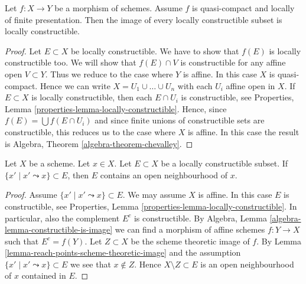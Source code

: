 \begin{theorem}
\label{theorem-chevalley}
\begin{reference}
\cite[IV, Theorem 1.8.4]{EGA}
\end{reference}
Let $f : X \to Y$ be a morphism of schemes.
Assume $f$ is quasi-compact and locally of finite presentation.
Then the image of every locally constructible subset is locally constructible.
\end{theorem}

\begin{proof}
Let $E \subset X$ be locally constructible.
We have to show that $f(E)$ is locally constructible too.
We will show that $f(E) \cap V$ is constructible for any affine
open $V \subset Y$. Thus we reduce to the case where $Y$ is affine.
In this case $X$ is quasi-compact. Hence we can write
$X = U_1 \cup \ldots \cup U_n$ with each $U_i$ affine open in $X$.
If $E \subset X$ is locally constructible, then each $E \cap U_i$
is constructible, see
Properties, Lemma \ref{properties-lemma-locally-constructible}.
Hence, since $f(E) = \bigcup f(E \cap U_i)$ and since finite unions of
constructible sets are constructible, this reduces us to the case where $X$
is affine. In this case the result is
Algebra, Theorem \ref{algebra-theorem-chevalley}.
\end{proof}

\begin{lemma}
\label{lemma-constructible-containing-open}
Let $X$ be a scheme. Let $x \in X$. Let $E \subset X$ be a locally
constructible subset. If $\{x' \mid x' \leadsto x\} \subset E$,
then $E$ contains an open neighbourhood of $x$.
\end{lemma}

\begin{proof}
Assume $\{x' \mid x' \leadsto x\} \subset E$.
We may assume $X$ is affine.
In this case $E$ is constructible, see
Properties, Lemma \ref{properties-lemma-locally-constructible}.
In particular, also the complement $E^c$ is constructible. By
Algebra, Lemma \ref{algebra-lemma-constructible-is-image}
we can find a morphism of affine schemes $f : Y \to X$ such that
$E^c = f(Y)$. Let $Z \subset X$ be the scheme theoretic image of $f$. By
Lemma \ref{lemma-reach-points-scheme-theoretic-image}
and the assumption $\{x' \mid x' \leadsto x\} \subset E$
we see that $x \not \in Z$. Hence $X \setminus Z \subset E$ is an
open neighbourhood of $x$ contained in $E$.
\end{proof}




